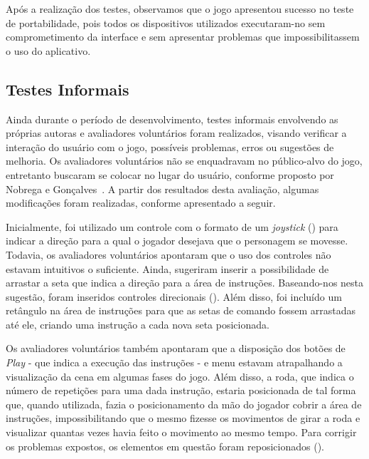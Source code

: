 Após a realização dos testes, observamos que o jogo apresentou sucesso no teste de portabilidade, pois todos os dispositivos utilizados executaram-no sem comprometimento da interface e sem apresentar problemas que impossibilitassem o uso do aplicativo. 

\subsection{Testes Informais} \label{ssec:informais}

Ainda durante o período de desenvolvimento, testes informais envolvendo as próprias autoras e avaliadores voluntários foram realizados, visando verificar a interação do usuário com o jogo, possíveis problemas, erros ou sugestões de melhoria. Os avaliadores voluntários não se enquadravam no público-alvo do jogo, entretanto buscaram se colocar no lugar do usuário, conforme proposto por Nobrega e Gonçalves~\cite{nobrega_metodo_2013}. A partir dos resultados desta avaliação, algumas modificações foram realizadas, conforme apresentado a seguir.

Inicialmente, foi utilizado um controle com o formato de um \textit{joystick} () para indicar a direção para a qual o jogador desejava que o personagem se movesse. Todavia, os avaliadores voluntários apontaram que o uso dos controles não estavam intuitivos o suficiente. Ainda, sugeriram inserir a possibilidade de arrastar a seta que indica a direção para a área de instruções. Baseando-nos nesta sugestão, foram inseridos controles direcionais (). Além disso, foi incluído um retângulo na área de instruções para que as setas de comando fossem arrastadas até ele, criando uma instrução a cada nova seta posicionada.



Os avaliadores voluntários também apontaram que a disposição dos botões de \textit{Play} - que indica a execução das instruções - e menu estavam atrapalhando a visualização da cena em algumas fases do jogo. Além disso, a roda, que indica o número de repetições para uma dada instrução, estaria posicionada de tal forma que, quando utilizada, fazia o posicionamento da mão do jogador cobrir a área de instruções, impossibilitando que o mesmo fizesse os movimentos de girar a roda e visualizar quantas vezes havia feito o movimento ao mesmo tempo. Para corrigir os problemas expostos, os elementos em questão foram reposicionados ().


